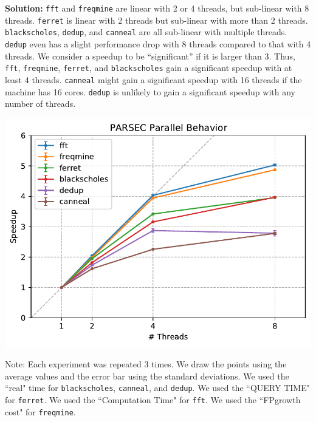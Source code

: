 \documentclass[11pt]{article}
\begin{document}
\begin{enumerate}
    \textbf{Solution:} \texttt{fft} and \texttt{freqmine} are linear with 2 or 4 threads, but sub-linear with 8 threads. \texttt{ferret} is linear with 2 threads but sub-linear with more than 2 threads. \texttt{blackscholes}, \texttt{dedup}, and \texttt{canneal} are all sub-linear with multiple threads. \texttt{dedup} even has a slight performance drop with 8 threads compared to that with 4 threads. We consider a speedup to be ``significant'' if it is larger than 3. Thus, \texttt{fft}, \texttt{freqmine}, \texttt{ferret}, and \texttt{blackscholes} gain a significant speedup with at least 4 threads. \texttt{canneal} might gain a significant speedup with 16 threads if the machine has 16 cores. \texttt{dedup} is unlikely to gain a significant speedup with any number of threads.
    \begin{center}
    {\includegraphics[scale=1]{plot_part2_q3.pdf}}
    \end{center}
    Note: Each experiment was repeated 3 times. We draw the points using the average values and the error bar using the standard deviations. We used the ``real" time for \texttt{blackscholes}, \texttt{canneal}, and \texttt{dedup}. We used the ``QUERY TIME" for \texttt{ferret}. We used the ``Computation Time" for \texttt{fft}. We used the ``FPgrowth cost" for \texttt{freqmine}.
    
\end{enumerate}
\end{document}
